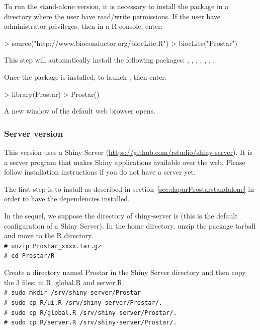 \documentclass[12pt]{article}
\newcommand{\shellcmd}[1]{\\\indent\indent\texttt{\footnotesize\# #1}}
\begin{document}
To run the stand-alone version, it is necessary to install the package in a directory where the user have read/write permissions. If the user have administrator privileges, then in a R console, enter:
\begin{Schunk}
\begin{Sinput}
> source("http://www.bioconductor.org/biocLite.R")
> biocLite("Prostar")
\end{Sinput}
\end{Schunk}

This step will automatically install the following packages: , , , , , , .

Once the package is installed, to launch , then enter:
\begin{Schunk}
\begin{Sinput}
> library(Prostar)
> Prostar()
\end{Sinput}
\end{Schunk}

A new window of the default web browser opens. 


\subsubsection{Server version} \label{sec:daparProstarserver}
This version uses a Shiny Server (\url{https://github.com/rstudio/shiny-server}). It is a server program that makes Shiny applications available over the web. Please follow installation instructions if you do not have a server yet.

The first step is to install  as described in section~\ref{sec:daparProstarstandalone} in order to have the dependencies installed.


In the sequel, we suppose the directory of shiny-server is  (this is the default configuration of a Shiny Server). In the home directory, unzip the package tarball and move to the R directory.\newline
\shellcmd{unzip Prostar\_xxxx.tar.gz}
\shellcmd{cd Prostar/R}\newline

Create a directory named Prostar in the Shiny Server directory and then copy the 3 files: ui.R, global.R and server.R.\newline
\shellcmd{sudo mkdir /srv/shiny-server/Prostar}
\shellcmd{sudo cp R/ui.R /srv/shiny-server/Prostar/.}
\shellcmd{sudo cp R/global.R /srv/shiny-server/Prostar/.}
\shellcmd{sudo cp R/server.R /srv/shiny-server/Prostar/.}\newline
\end{document}
